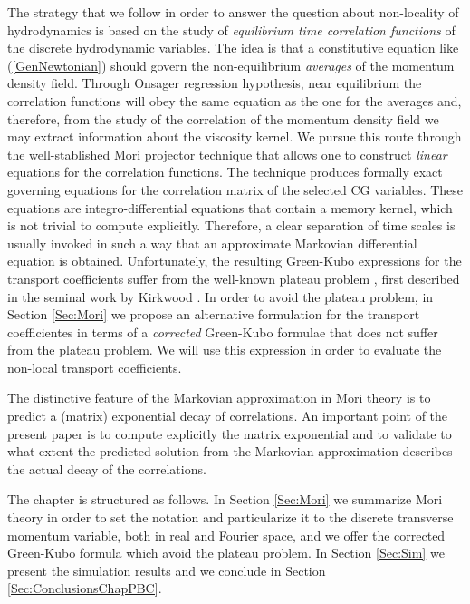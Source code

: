 \documentclass[a4paper,openright,12pt]{book}
\begin{document}
The strategy  that we follow in  order to answer
the question about non-locality of hydrodynamics is based on the study
of  \textit{equilibrium time  correlation functions}  of the  discrete
hydrodynamic variables.  The idea is that a constitutive equation like
(\ref{GenNewtonian})     should     govern     the     non-equilibrium
\textit{averages}  of the  momentum  density  field.  Through  Onsager
regression hypothesis, near equilibrium the correlation functions will
obey the  same equation as  the one  for the averages  and, therefore,
from the study of the correlation of the momentum density field we may
extract information about the viscosity  kernel.  We pursue this route
through the  well-stablished Mori projector technique  that allows one
to construct \textit{linear} equations  for the correlation functions.
The  technique produces  formally  exact governing  equations for  the
correlation matrix of the selected  CG variables.  These equations are
integro-differential equations that contain  a memory kernel, which is
not trivial to  compute explicitly.  Therefore, a  clear separation of
time  scales is  usually invoked  in such  a way  that an  approximate
Markovian  differential  equation  is  obtained.   Unfortunately,  the
resulting Green-Kubo expressions for the transport coefficients suffer
from   the  well-known   plateau  problem   \cite{Espanol1998},  first
described in the seminal work by Kirkwood \cite{Kirkwood1949}. In order to avoid the plateau problem, in Section \ref{Sec:Mori} we propose an alternative formulation for the transport coefficientes in terms of a  \textit{corrected} Green-Kubo formulae that
does  not suffer  from the  plateau problem. We will use this expression  in order to evaluate the non-local
transport coefficients.

The distinctive feature of the  Markovian approximation in Mori theory
is  to  predict  a  (matrix) exponential  decay  of  correlations.  An
important  point of  the present  paper is  to compute  explicitly the
matrix  exponential  and to  validate  to  what extent  the  predicted
solution from  the Markovian approximation describes  the actual decay
of the correlations.

The chapter is structured as follows. In Section \ref{Sec:Mori} we summarize
Mori theory in  order to set the notation and  particularize it to the
discrete transverse momentum variable, both in real and Fourier space, and we offer the corrected Green-Kubo formula which avoid the plateau problem.
In Section \ref{Sec:Sim} we present the simulation results and we conclude
in Section \ref{Sec:ConclusionsChapPBC}.
\end{document}
